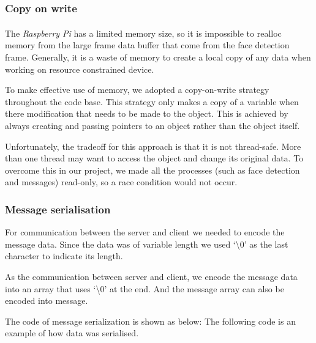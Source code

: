 \documentclass[11pt,a4paper,titlepage]{report}
\newcommand{\rpi}{\textit{Raspberry Pi\textsuperscript{\textregistered}}}
\begin{document}
\subsubsection{Copy on write}

The \rpi\xspace has a limited memory size, so it is impossible to realloc memory from the large frame data buffer that come from the face detection frame. Generally, it is a waste of memory to create a local copy of any data when working on resource constrained device.

To make effective use of memory, we adopted a copy-on-write strategy throughout the code base. This strategy only makes a copy of a variable when there modification that needs to be made to the object. This is achieved by always creating and passing pointers to an object rather than the object itself.

Unfortunately, the tradeoff for this approach is that it is not thread-safe. More than one thread may want to access the object and change its original data. To overcome this in our project, we made all the processes (such as face detection and messages) read-only, so a race condition would not occur.



\subsubsection{Message serialisation}

For communication between the server and client we needed to encode the message data. Since the data was of variable length we used `\textbackslash0' as the last character to indicate its length.

As the communication between server and client, we encode the message data into an array that uses `\textbackslash0' at the end. And the message array can also be encoded into message.

The code of message serialization is shown as below:
The following code is an example of how data was serialised.
\end{document}
